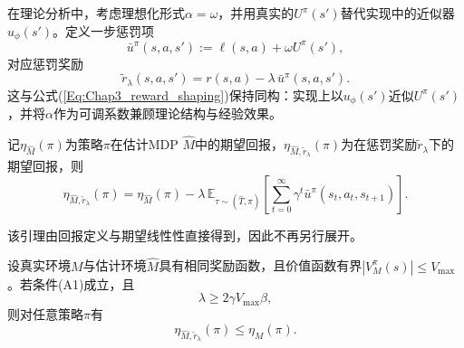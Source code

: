 在理论分析中，考虑理想化形式$\alpha=\omega$，并用真实的$U^{\pi}(s')$替代实现中的近似器$u_\phi(s')$。定义一步惩罚项
\begin{equation}
  \bar{u}^{\pi}(s,a,s'):=\ell(s,a)+\omega U^{\pi}(s'),
\end{equation}
对应惩罚奖励
\begin{equation}
  \tilde{r}_{\lambda}(s,a,s')=r(s,a)-\lambda\,\bar{u}^{\pi}(s,a,s').
\end{equation}
这与公式(\ref{Eq:Chap3_reward_shaping})保持同构：实现上以$u_\phi(s')$近似$U^{\pi}(s')$，并将$\alpha$作为可调系数兼顾理论结构与经验效果。

\begin{lem}[惩罚目标的期望回报分解]\label{Lem:Chap3_decomposition}
  记$\eta_{\hat{M}}(\pi)$为策略$\pi$在估计MDP $\hat{M}$中的期望回报，$\eta_{\hat{M},\tilde{r}_{\lambda}}(\pi)$为在惩罚奖励$\tilde{r}_{\lambda}$下的期望回报，则
  \begin{equation}
    \eta_{\hat{M},\tilde{r}_{\lambda}}(\pi)
    =\eta_{\hat{M}}(\pi)-\lambda\,\mathbb{E}_{\tau\sim(\hat{T},\pi)}\left[\sum_{t=0}^{\infty}\gamma^t\bar{u}^{\pi}(s_t,a_t,s_{t+1})\right].
  \end{equation}
\end{lem}

该引理由回报定义与期望线性性直接得到，因此不再另行展开。

\begin{thm}[累积不确定性惩罚的保守性]\label{Thm:Chap3_balance}
  设真实环境$M$与估计环境$\hat{M}$具有相同奖励函数，且价值函数有界$|V_M^{\pi}(s)|\le V_{\max}$。若条件(A1)成立，且
  \begin{equation}
    \lambda\ge2\gamma V_{\max}\beta,
  \end{equation}
  则对任意策略$\pi$有
  \begin{equation}
    \eta_{\hat{M},\tilde{r}_{\lambda}}(\pi)\le\eta_M(\pi).
  \end{equation}
\end{thm}

